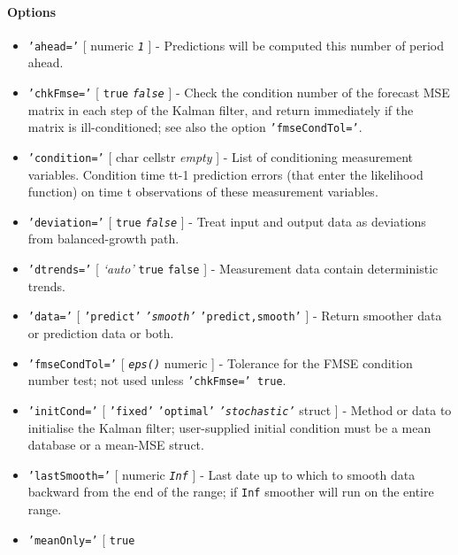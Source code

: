 \paragraph{Options}\label{options}

\begin{itemize}
\item
  \texttt{'ahead='} {[} numeric \textbar{} \emph{\texttt{1}} {]} -
  Predictions will be computed this number of period ahead.
\item
  \texttt{'chkFmse='} {[} \texttt{true} \textbar{} \emph{\texttt{false}}
  {]} - Check the condition number of the forecast MSE matrix in each
  step of the Kalman filter, and return immediately if the matrix is
  ill-conditioned; see also the option \texttt{'fmseCondTol='}.
\item
  \texttt{'condition='} {[} char \textbar{} cellstr \textbar{}
  \emph{empty} {]} - List of conditioning measurement variables.
  Condition time t\textbar{}t-1 prediction errors (that enter the
  likelihood function) on time t observations of these measurement
  variables.
\item
  \texttt{'deviation='} {[} \texttt{true} \textbar{}
  \emph{\texttt{false}} {]} - Treat input and output data as deviations
  from balanced-growth path.
\item
  \texttt{'dtrends='} {[} \emph{`auto'} \textbar{} \texttt{true}
  \textbar{} \texttt{false} {]} - Measurement data contain deterministic
  trends.
\item
  \texttt{'data='} {[} \texttt{'predict'} \textbar{}
  \emph{\texttt{'smooth'}} \textbar{} \texttt{'predict,smooth'} {]} -
  Return smoother data or prediction data or both.
\item
  \texttt{'fmseCondTol='} {[} \emph{\texttt{eps()}} \textbar{} numeric
  {]} - Tolerance for the FMSE condition number test; not used unless
  \texttt{'chkFmse=' true}.
\item
  \texttt{'initCond='} {[} \texttt{'fixed'} \textbar{}
  \texttt{'optimal'} \textbar{} \emph{\texttt{'stochastic'}} \textbar{}
  struct {]} - Method or data to initialise the Kalman filter;
  user-supplied initial condition must be a mean database or a mean-MSE
  struct.
\item
  \texttt{'lastSmooth='} {[} numeric \textbar{} \emph{\texttt{Inf}} {]}
  - Last date up to which to smooth data backward from the end of the
  range; if \texttt{Inf} smoother will run on the entire range.
\item
  \texttt{'meanOnly='} {[} \texttt{true} \textbar{}

\end{itemize}
